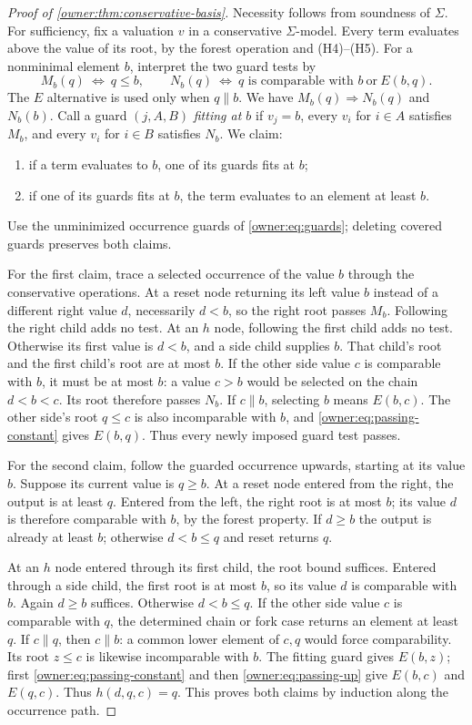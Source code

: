 \begin{proof}[Proof of \cref{owner:thm:conservative-basis}]
Necessity follows from soundness of $\Sigma$. For sufficiency, fix a
valuation $v$ in a conservative $\Sigma$-model. Every term evaluates
above the value of its root, by the forest operation and (H4)--(H5).
For a nonminimal element $b$, interpret the two guard tests by
\[
 M_b(q)\ \Longleftrightarrow\ q\leq b,
 \qquad
 N_b(q)\ \Longleftrightarrow\
 q\text{ is comparable with }b\ \text{or}\ E(b,q).
\]
The $E$ alternative is used only when $q\parallel b$.
We have $M_b(q)\Rightarrow N_b(q)$ and $N_b(b)$.
Call a guard $(j,A,B)$ \emph{fitting at $b$} if $v_j=b$,
every $v_i$ for $i\in A$ satisfies $M_b$, and every $v_i$ for
$i\in B$ satisfies $N_b$. We claim:
\begin{enumerate}
\item if a term evaluates to $b$, one of its guards fits at $b$;
\item if one of its guards fits at $b$, the term evaluates to an
element at least $b$.
\end{enumerate}
Use the unminimized occurrence guards of
\eqref{owner:eq:guards}; deleting covered guards preserves both claims.

For the first claim, trace a selected occurrence of the value $b$
through the conservative operations. At a reset node returning its
left value $b$ instead of a different right value $d$, necessarily
$d<b$, so the right root passes $M_b$. Following the right child
adds no test. At an $h$ node, following the first child adds no test.
Otherwise its first value is $d<b$, and a side child supplies $b$.
That child's root and the first child's root are at most $b$.
If the other side value $c$ is comparable with $b$, it must be at
most $b$: a value $c>b$ would be selected on the chain $d<b<c$.
Its root therefore passes $N_b$. If $c\parallel b$, selecting $b$
means $E(b,c)$. The other side's root $q\leq c$ is also incomparable
with $b$, and \eqref{owner:eq:passing-constant} gives $E(b,q)$.
Thus every newly imposed guard test passes.

For the second claim, follow the guarded occurrence upwards, starting
at its value $b$. Suppose its current value is $q\geq b$.
At a reset node entered from the right, the output is at least $q$.
Entered from the left, the right root is at most $b$; its value $d$
is therefore comparable with $b$, by the forest property. If $d\geq b$
the output is already at least $b$; otherwise $d<b\leq q$ and reset
returns $q$.

At an $h$ node entered through its first child, the root bound suffices.
Entered through a side child, the first root is at most $b$, so its
value $d$ is comparable with $b$. Again $d\geq b$ suffices. Otherwise
$d<b\leq q$. If the other side value $c$ is comparable with $q$,
the determined chain or fork case returns an element at least $q$.
If $c\parallel q$, then $c\parallel b$: a common lower element of
$c,q$ would force comparability. Its root $z\leq c$ is likewise
incomparable with $b$. The fitting guard gives $E(b,z)$; first
\eqref{owner:eq:passing-constant} and then
\eqref{owner:eq:passing-up} give $E(b,c)$ and $E(q,c)$.
Thus $h(d,q,c)=q$. This proves both claims by induction along
the occurrence path.


\end{proof}
